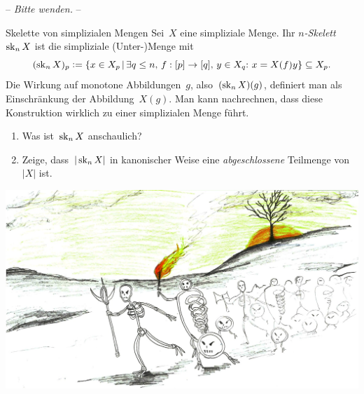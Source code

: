 \documentclass{uebblatt}
\begin{document}
\begin{center}-- \emph{Bitte wenden.} --\end{center}

\newpage

\begin{aufgabe}{Skelette von simplizialen Mengen}
Sei~$X$ eine simpliziale Menge. Ihr \emph{$n$-Skelett}~$\operatorname{sk}_n X$ ist die
simpliziale (Unter-)Menge mit
\[ (\sk_n X)_p \defeq \{ x \in X_p \,|\,
  \exists q \leq n,\, f : [p] \to [q],\, y \in X_q{:}\ 
  x = X(f)y \} \subseteq X_p. \]
Die Wirkung auf monotone Abbildungen~$g$, also~$(\operatorname{sk}_n X)(g)$, definiert man als
Einschränkung der Abbildung~$X(g)$. Man kann nachrechnen, dass diese
Konstruktion wirklich zu einer simplizialen Menge führt.

\begin{enumerate}
\item Was ist~$\operatorname{sk}_n X$ anschaulich?
\item Zeige, dass~$|\operatorname{sk}_n X|$ in kanonischer Weise eine \emph{abgeschlossene}
Teilmenge von~$|X|$ ist.
\end{enumerate}
\end{aufgabe}

\begin{center}
  \includegraphics{knotenarmee}
\end{center}
\end{document}
